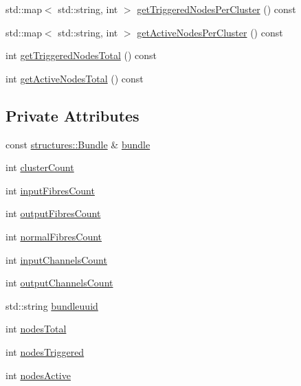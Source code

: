 \begin{DoxyCompactItemize}
std\-::map$<$ std\-::string, int $>$ \hyperlink{classcryomesh_1_1utilities_1_1Statistician_ab38d0c6cfb206e6c331c6af95388faab}{get\-Triggered\-Nodes\-Per\-Cluster} () const 
\item 
std\-::map$<$ std\-::string, int $>$ \hyperlink{classcryomesh_1_1utilities_1_1Statistician_a9e6c8527426ae11edbedbc21b4215007}{get\-Active\-Nodes\-Per\-Cluster} () const 
\item 
int \hyperlink{classcryomesh_1_1utilities_1_1Statistician_a4a60fac1c7060a891feae84096109315}{get\-Triggered\-Nodes\-Total} () const 
\item 
int \hyperlink{classcryomesh_1_1utilities_1_1Statistician_af743b58d7a21f7c0056252d15c71016d}{get\-Active\-Nodes\-Total} () const 
\end{DoxyCompactItemize}
\subsection*{\-Private \-Attributes}
\begin{DoxyCompactItemize}
\item 
const \hyperlink{classcryomesh_1_1structures_1_1Bundle}{structures\-::\-Bundle} \& \hyperlink{classcryomesh_1_1utilities_1_1Statistician_a478ec1e4a9b68063f1422e97d8cbea99}{bundle}
\item 
int \hyperlink{classcryomesh_1_1utilities_1_1Statistician_af6b5d81fc1b6821e7fff8d4ccbcf15bb}{cluster\-Count}
\item 
int \hyperlink{classcryomesh_1_1utilities_1_1Statistician_a12780e2d450e3013d6a8a306a4b02bd7}{input\-Fibres\-Count}
\item 
int \hyperlink{classcryomesh_1_1utilities_1_1Statistician_a90aeaf6f65a5cad0b3936731378ea07a}{output\-Fibres\-Count}
\item 
int \hyperlink{classcryomesh_1_1utilities_1_1Statistician_a1540b6a7e491f9241f31fbcfd62bdd74}{normal\-Fibres\-Count}
\item 
int \hyperlink{classcryomesh_1_1utilities_1_1Statistician_a734a2d7317a2d1a08dfa64a6f5a7da8c}{input\-Channels\-Count}
\item 
int \hyperlink{classcryomesh_1_1utilities_1_1Statistician_aa13c9110a9a210b7656ec815166f20c2}{output\-Channels\-Count}
\item 
std\-::string \hyperlink{classcryomesh_1_1utilities_1_1Statistician_af2c7a19dfd7c305b1767a3abec4cb75e}{bundleuuid}
\item 
int \hyperlink{classcryomesh_1_1utilities_1_1Statistician_a4395675ddbfb598566faca1096bfe2da}{nodes\-Total}
\item 
int \hyperlink{classcryomesh_1_1utilities_1_1Statistician_a5a38000033e2405dcfac5ef48d2a6820}{nodes\-Triggered}
\item 
int \hyperlink{classcryomesh_1_1utilities_1_1Statistician_aab51af29476bb894d8f145b8ce3d80ce}{nodes\-Active}
\end{DoxyCompactItemize}
